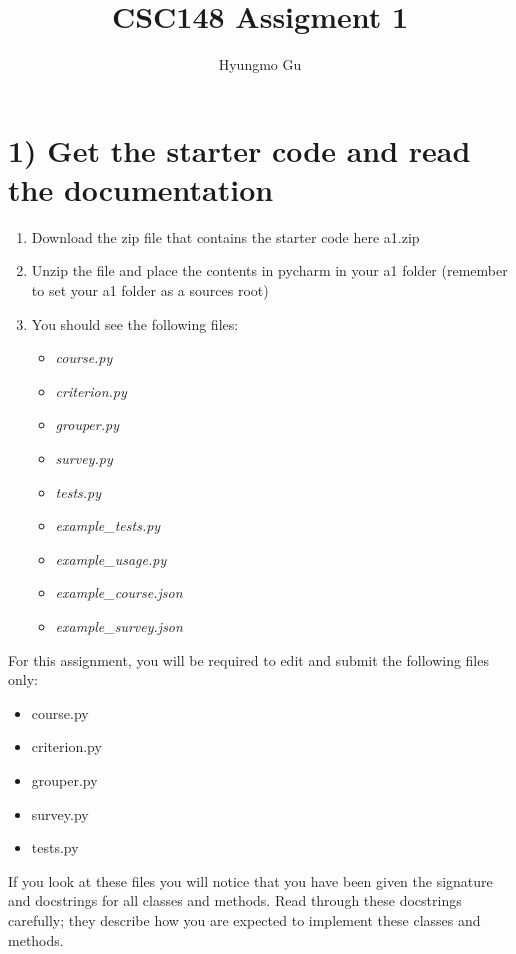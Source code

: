 \documentclass[12pt]{article}
\begin{document}
\title{CSC148 Assigment 1}
\author{Hyungmo Gu}
\maketitle

\section*{1) Get the starter code and read the documentation}
\begin{enumerate}[1.]
    \item Download the zip file that contains the starter code here a1.zip
    \item Unzip the file and place the contents in pycharm in your a1 folder (remember to set your a1 folder as a sources root)
    \item You should see the following files:
    \begin{itemize}
        \item \textit{course.py}
        \item \textit{criterion.py}
        \item \textit{grouper.py}
        \item \textit{survey.py}
        \item \textit{tests.py}
        \item \textit{example\_tests.py}
        \item \textit{example\_usage.py}
        \item \textit{example\_course.json}
        \item \textit{example\_survey.json}
    \end{itemize}

\end{enumerate}

\bigskip

\noindent For this assignment, you will be required to edit and submit the following files only:

\begin{itemize}
    \item course.py
    \item criterion.py
    \item grouper.py
    \item survey.py
    \item tests.py
\end{itemize}

\bigskip

\noindent If you look at these files you will notice that you have been given the signature
and docstrings for all classes and methods. Read through these docstrings carefully;
they describe how you are expected to implement these classes and methods.
\end{document}
